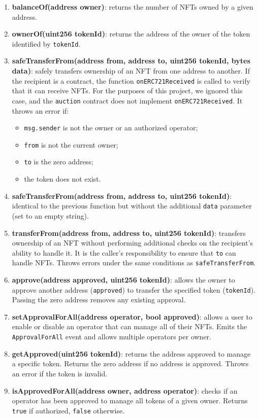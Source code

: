 \documentclass[conference]{IEEEtran}
\begin{document}
\begin{enumerate}
    \item \textbf{balanceOf(address owner)}:
    returns the number of NFTs owned by a given address.
\item \textbf{ownerOf(uint256 tokenId)}:  
returns the address of the owner of the token identified by \texttt{tokenId}.  

\item \textbf{safeTransferFrom(address from, address to, uint256 tokenId, bytes data)}:  
safely transfers ownership of an NFT from one address to another.  
If the recipient is a contract, the function \texttt{onERC721Received} is called to verify that it can receive NFTs.  
For the purposes of this project, we ignored this case, and the \texttt{auction} contract does not implement \texttt{onERC721Received}.  
It throws an error if:
\begin{itemize}
    \item \texttt{msg.sender} is not the owner or an authorized operator;
    \item \texttt{from} is not the current owner;
    \item \texttt{to} is the zero address;
    \item the token does not exist.
\end{itemize}

\item \textbf{safeTransferFrom(address from, address to, uint256 tokenId)}:  
identical to the previous function but without the additional \texttt{data} parameter (set to an empty string).  

\item \textbf{transferFrom(address from, address to, uint256 tokenId)}:  
transfers ownership of an NFT without performing additional checks on the recipient’s ability to handle it.  
It is the caller’s responsibility to ensure that \texttt{to} can handle NFTs.  
Throws errors under the same conditions as \texttt{safeTransferFrom}.  

\item \textbf{approve(address approved, uint256 tokenId)}:  
allows the owner to approve another address (\texttt{approved}) to transfer the specified token (\texttt{tokenId}).  
Passing the zero address removes any existing approval.  

\item \textbf{setApprovalForAll(address operator, bool approved)}:  
allows a user to enable or disable an operator that can manage all of their NFTs.  
Emits the \texttt{ApprovalForAll} event and allows multiple operators per owner.  

\item \textbf{getApproved(uint256 tokenId)}:  
returns the address approved to manage a specific token.  
Returns the zero address if no address is approved.  
Throws an error if the token is invalid.  

\item \textbf{isApprovedForAll(address owner, address operator)}:  
checks if an operator has been approved to manage all tokens of a given owner.  
Returns \texttt{true} if authorized, \texttt{false} otherwise.
\end{enumerate}
\end{document}

